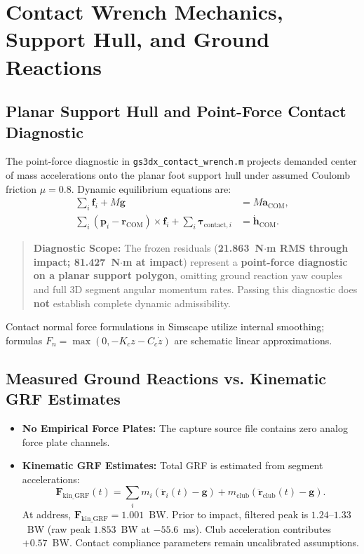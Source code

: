 \documentclass[11pt,a4paper]{article}
\begin{document}
\section{Contact Wrench Mechanics, Support Hull, and Ground Reactions}

\subsection{Planar Support Hull and Point-Force Contact Diagnostic}
The point-force diagnostic in \texttt{gs3dx\_contact\_wrench.m} projects demanded center of mass accelerations onto the planar foot support hull under assumed Coulomb friction $\mu = 0.8$. Dynamic equilibrium equations are:
\begin{align}
    \sum_{i} \mathbf{f}_i + M \mathbf{g} &= M \mathbf{a}_{\text{COM}}, \\
    \sum_{i} (\mathbf{p}_i - \mathbf{r}_{\text{COM}}) \times \mathbf{f}_i + \sum_{i} \boldsymbol{\tau}_{\text{contact}, i} &= \dot{\mathbf{h}}_{\text{COM}}.
\end{align}
\begin{quote}
\textbf{Diagnostic Scope:} The frozen residuals (\textbf{21.863~N$\cdot$m RMS through impact; 81.427~N$\cdot$m at impact}) represent a \textbf{point-force diagnostic on a planar support polygon}, omitting ground reaction yaw couples and full 3D segment angular momentum rates. Passing this diagnostic does \textbf{not} establish complete dynamic admissibility.
\end{quote}
Contact normal force formulations in Simscape utilize internal smoothing; formulas $F_n = \max(0, -K_c z - C_c \dot{z})$ are schematic linear approximations.

\subsection{Measured Ground Reactions vs. Kinematic GRF Estimates}
\begin{itemize}
    \item \textbf{No Empirical Force Plates:} The capture source file contains zero analog force plate channels.
    \item \textbf{Kinematic GRF Estimates:} Total GRF is estimated from segment accelerations:
    \begin{equation}
        \mathbf{F}_{\text{kin\_GRF}}(t) = \sum_{i} m_i (\ddot{\mathbf{r}}_i(t) - \mathbf{g}) + m_{\text{club}} (\ddot{\mathbf{r}}_{\text{club}}(t) - \mathbf{g}).
    \end{equation}
    At address, $\mathbf{F}_{\text{kin\_GRF}} = 1.001$~BW. Prior to impact, filtered peak is $1.24$--$1.33$~BW (raw peak $1.853$~BW at $-55.6$~ms). Club acceleration contributes $+0.57$~BW. Contact compliance parameters remain uncalibrated assumptions.
\end{itemize}
\end{document}
